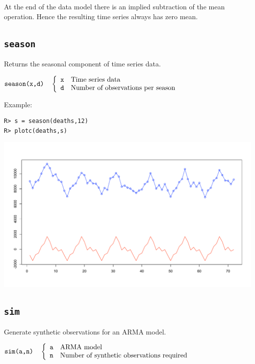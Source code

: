 \documentclass[12pt]{article}
\begin{document}
\noindent
At the end of the data model there
is an implied subtraction of the mean operation.
Hence the resulting time series always has zero mean.

\newpage

\subsection{\tt season}
Returns the seasonal component of time series data.

\bigskip
$
\hbox{\tt season(x,d)}\quad\left\{\begin{array}{ll}
{\tt x} & \hbox{Time series data}\\
{\tt d} & \hbox{Number of observations per season}
\end{array}\right.
$

\bigskip
\noindent
Example:

\begin{verbatim}
R> s = season(deaths,12)
R> plotc(deaths,s)
\end{verbatim}

\begin{center}
\includegraphics[scale=0.3]{Rplot-1.pdf}
\end{center}

\newpage

\subsection{\tt sim}
Generate synthetic observations for an ARMA model.

\bigskip
$
\hbox{\tt sim(a,n)}\quad\left\{\begin{array}{ll}
{\tt a} & \hbox{ARMA model}\\
{\tt n} & \hbox{Number of synthetic observations required}
\end{array}\right.
$
\end{document}
